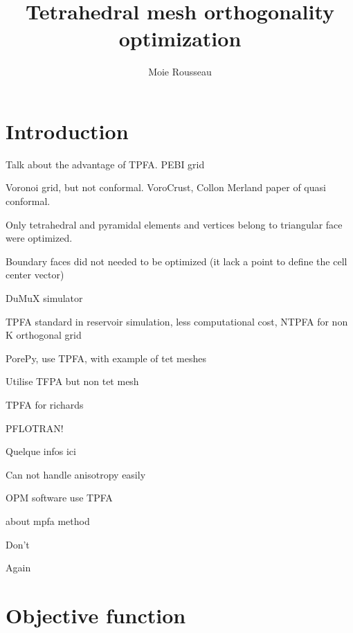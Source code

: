 \documentclass[11pt]{article}
\title{\textbf{Tetrahedral mesh orthogonality optimization}}
\author{Moie Rousseau}
\date{}
\begin{document}
\maketitle
\thispagestyle{empty}

\section{Introduction}

Talk about the advantage of TPFA. PEBI grid

Voronoi grid, but not conformal. VoroCrust, Collon Merland paper of quasi conformal. 

Only tetrahedral and pyramidal elements and vertices belong to triangular face were optimized.

Boundary faces did not needed to be optimized (it lack a point to define the cell center vector)

DuMuX simulator %

TPFA standard in reservoir simulation, less computational cost, NTPFA for non K orthogonal grid %

PorePy, use TPFA, with example of tet meshes %

Utilise TFPA but non tet mesh %

TPFA for richards %

PFLOTRAN!

Quelque infos ici %

Can not handle anisotropy easily %

OPM software use TPFA %

about mpfa method %

Don't

Again


\section{Objective function}
\end{document}

